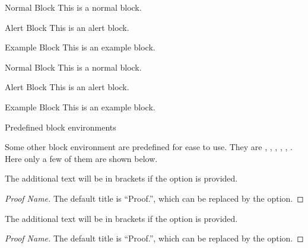 \begin{fragileframe}

\begin{example}
\begin{LCL}
\begin{block}{Normal Block}
  This is a normal block.
\end{block}
\begin{alertblock}{Alert Block}
  This is an alert block.
\end{alertblock}
\begin{exampleblock}{Example Block}
  This is an example block.
\end{exampleblock}
\end{LCL}
\end{example}

\begin{block}{Normal Block}
  This is a normal block.
\end{block}

\begin{alertblock}{Alert Block}
  This is an alert block.
\end{alertblock}

\begin{exampleblock}{Example Block}
  This is an example block.
\end{exampleblock}

\end{fragileframe}


\begin{fragileframe}{Predefined block environments}

Some other block environment are predefined for ease to use. They are , , , , , . Here only a few of them are shown below.


\begin{example}
\begin{LCL}
\begin{theorem}
  The additional text will be in brackets if the option is provided.
\end{theorem}
\begin{proof}[Proof Name]
  The default title is ``Proof.'', which can be replaced by the option.
\end{proof}
\end{LCL}
\end{example}

\begin{theorem}
  The additional text will be in brackets if the option is provided.
\end{theorem}
\begin{proof}[Proof Name]
  The default title is ``Proof.'', which can be replaced by the option.
\end{proof}

\end{fragileframe}

